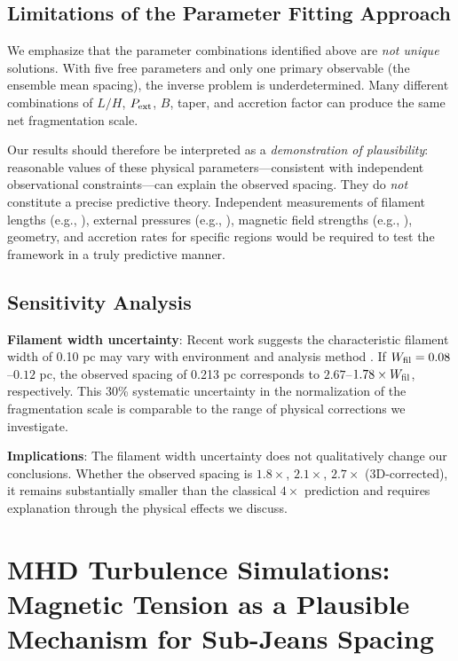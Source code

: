 \documentclass[11pt,a4paper]{article}
\begin{document}
\subsection{Limitations of the Parameter Fitting Approach}

We emphasize that the parameter combinations identified above are \textit{not unique} solutions. With five free parameters and only one primary observable (the ensemble mean spacing), the inverse problem is underdetermined. Many different combinations of $L/H$, $P_{\rm ext}$, $B$, taper, and accretion factor can produce the same net fragmentation scale.

Our results should therefore be interpreted as a \textit{demonstration of plausibility}: reasonable values of these physical parameters—consistent with independent observational constraints—can explain the observed spacing. They do \textit{not} constitute a precise predictive theory. Independent measurements of filament lengths (e.g., \citet{Arzoumanian2019}), external pressures (e.g., \citet{Fischera2012}), magnetic field strengths (e.g., \citet{Crutcher2012}), geometry, and accretion rates for specific regions would be required to test the framework in a truly predictive manner.

\subsection{Sensitivity Analysis}
\label{sec:sensitivity}

\textbf{Filament width uncertainty}: Recent work suggests the characteristic filament width of 0.10 pc may vary with environment and analysis method \citep{Panopoulou2022, Hacar2023}. If $W_{\rm fil} = 0.08$--$0.12$ pc, the observed spacing of 0.213 pc corresponds to $2.67$--$1.78\times W_{\rm fil}$, respectively. This 30\% systematic uncertainty in the normalization of the fragmentation scale is comparable to the range of physical corrections we investigate.

\textbf{Implications}: The filament width uncertainty does not qualitatively change our conclusions. Whether the observed spacing is $1.8\times$, $2.1\times$, $2.7\times$ (3D-corrected), it remains substantially smaller than the classical $4\times$ prediction and requires explanation through the physical effects we discuss.

\section{MHD Turbulence Simulations: Magnetic Tension as a Plausible Mechanism for Sub-Jeans Spacing}
\label{sec:mhd}
\end{document}
